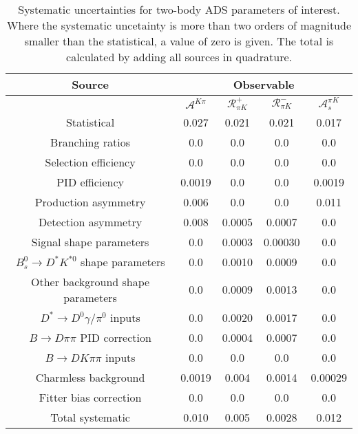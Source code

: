 \begin{sidewaystable}
  \centering
  \begin{tabular}{ccccc}
      \toprule
      Source & \multicolumn{4}{c}{Observable} \\
      \midrule
       & $\mathcal{A}^{K\pi}$ & $\mathcal{R}_{\pi K}^+$ & $\mathcal{R}_{\pi K}^-$ & $\mathcal{A}_s^{\pi K}$ \\
      \midrule
      Statistical & 0.027 & 0.021 & 0.021 & 0.017 \\
      \midrule
      Branching ratios & 0.0  & 0.0  & 0.0  & 0.0  \\
      Selection efficiency & 0.0  & 0.0  & 0.0  & 0.0  \\
      PID efficiency & 0.0019 & 0.0  & 0.0  & 0.0019 \\
      Production asymmetry & 0.006 & 0.0  & 0.0  & 0.011 \\
      Detection asymmetry & 0.008 & 0.0005 & 0.0007 & 0.0  \\
      Signal shape parameters & 0.0  & 0.0003 & 0.00030 & 0.0  \\
      $B^0_s \to D^* K^{*0}$ shape parameters & 0.0  & 0.0010 & 0.0009 & 0.0  \\
      Other background shape parameters & 0.0  & 0.0009 & 0.0013 & 0.0  \\
      $D^* \to D^0 \gamma/\pi^0$ inputs & 0.0  & 0.0020 & 0.0017 & 0.0  \\
      $B\to D\pi\pi$ PID correction & 0.0  & 0.0004 & 0.0007 & 0.0  \\
      $B\to DK\pi\pi$ inputs & 0.0  & 0.0  & 0.0  & 0.0  \\
      Charmless background & 0.0019 & 0.004 & 0.0014 & 0.00029 \\
      Fitter bias correction & 0.0  & 0.0  & 0.0  & 0.0  \\
      \midrule
      Total systematic & 0.010 & 0.005 & 0.0028 & 0.012 \\
      \bottomrule
  \end{tabular}
  \caption{Systematic uncertainties for two-body ADS parameters of interest. Where the systematic uncetainty is more than two orders of magnitude smaller than the statistical, a value of zero is given. The total is calculated by adding all sources in quadrature.}
\label{tab:twoBody_ADS_systematics}
\end{sidewaystable}
